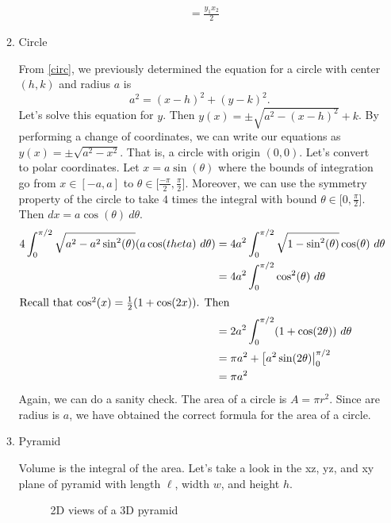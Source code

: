\begin{enumerate}
\begin{enumerate}[label = (\alph*), ref = \theenumi{(\alph*)}]
\begin{align*}
      &= \frac{y_1x_2}{2}
    \end{align*}
  \item
    \label{15b}
    Circle
    \par\smallskip
    From \cref{circ}, we previously determined the equation for a circle with
    center \((h, k)\) and radius \(a\) is
    \[
    a^2 = (x - h)^2 + (y - k)^2.
    \]
    Let's solve this equation for \(y\).
    Then \(y(x) = \pm\sqrt{a^2 - (x - h)^2} + k\).
    By performing a change of coordinates, we can write our equations as
    \(y(x) = \pm\sqrt{a^2 - x^2}\).
    That is, a circle with origin \((0, 0)\).
    Let's convert to polar coordinates.
    Let \(x = a\sin(\theta)\) where the bounds of integration go from
    \(x\in[-a, a]\) to \(\theta\in\big[\frac{-\pi}{2}, \frac{\pi}{2}\big]\).
    Moreover, we can use the symmetry property of the circle to take \(4\) times
    the integral with bound \(\theta\in\big[0, \frac{\pi}{2}\big]\).
    Then \(dx = a\cos(\theta) \ d\theta\).
    \begin{align*}
      4\int_0^{\pi/2}\sqrt{a^2 - a^2\sin^2(\theta)}(a\cos(theta) \ d\theta)
      &= 4a^2\int_0^{\pi/2}\sqrt{1 - \sin^2(\theta)}\cos(\theta) \ d\theta\\
      &= 4a^2\int_0^{\pi/2}\cos^2(\theta) \ d\theta\\
      \intertext{Recall that \(\cos^2(x) = \frac{1}{2}(1 + \cos(2x))\).
      Then}
      &= 2a^2\int_0^{\pi/2}(1 + \cos(2\theta)) \ d\theta\\
      &= \pi a^2 + \big[a^2\sin(2\theta)\big|_0^{\pi/2}\\
      &= \pi a^2
    \end{align*}
    Again, we can do a sanity check.
    The area of a circle is \(A = \pi r^2\).
    Since are radius is \(a\), we have obtained the correct formula for the area
    of a circle.
  \item
    \label{15c}
    Pyramid
    \par\smallskip
    Volume is the integral of the area.
    Let's take a look in the xz, yz, and xy plane of pyramid with length
    \(\ell\), width \(w\), and height \(h\).
    \begin{figure}[H]
      \centering
      \caption{2D views of a 3D pyramid}

\end{figure}
\end{enumerate}
\end{enumerate}

